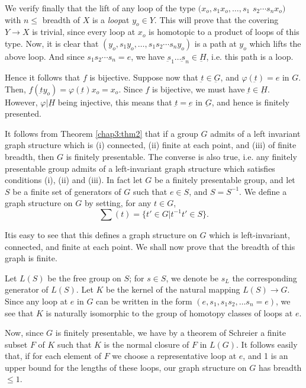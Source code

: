 We verify finally that the lift of any loop of the type $(x_o,s_1 x_o
, \ldots, s_1$ $s_2 \cdots s_n x_o)$ with $n \leq $ breadth of $X$ is a
\textit{ loop}at $y_o \in Y$. This will prove that the covering $Y \to
X$ is trivial, since every loop at $x_o$ is homotopic to a product of
loops of this type.  Now, it is clear that $(y_o,s_1 y_o , \ldots ,
s_1 s_2 \cdots s_n y_o)$ is a path at $y_o$ which lifts the above
loop. And since $s_1 s_2 \cdots s_n = e$, we have $\underbar{s}_1
\ldots \underbar{s}_n \in \underbar{H}$, i.e. this path is a loop. 

Hence it follows that $f$ is bijective. Suppose now that $\underbar{t}
\in \underbar{G}$, and $\varphi (\underbar{t}) =e$ in $G$. Then,
$f(\underbar{t} y_o) =\varphi(\underbar{t}) x_o =x_o$. Since $f$ is
bijective, we must have $\underbar{t} \in \underbar{H}$. However,
$\varphi | \underbar{H}$ being injective, this means that
$\underbar{t} = \underbar{e}$ in $\underbar{G}$, and hence is finitely
presented. 

\begin{remark*}
  It follows from Theorem \ref{chap3:thm2} that if a group $G$ admits of a left
  invariant graph structure which is (i) connected, (ii) finite at
  each point, and (iii) of finite breadth, then $G$ is finitely
  presentable. The converse is also true, i.e. any finitely presentable
  group admits of a left-invariant graph structure which satisfies
  conditions (i), (ii) and (iii). In fact let $G$ be a finitely
  presentable group, and let $S$ be a finite set of generators of $G$
  such that $e \in S$, and $S = S^{-1}$. We define a graph structure on
  $G$ by setting, for any $t \in G$, 
  $$
  \sum(t) = \{ t' \in G|t^{-1}t' \in S \}.
  $$
\end{remark*}

It\pageoriginale is easy to see that this defines a graph structure on
$G$ which is 
left-invariant, connected, and finite at each point. We shall now
prove that the breadth of this graph is finite. 

Let $L(S)$ be the free group on $S$; for $s \in S$, we denote be $s_L$
the corresponding generator of $L(S)$. Let $K$ be the kernel of the
natural mapping $L(S) \to G$. Since any loop at $e$ in $G$ can be
written in the form $(e,s_1, s_1s_2, \ldots s_n =e)$, we see that $K$
is naturally isomorphic to the group of homotopy classes of loops at
$e$. 

Now, since $G$ is finitely presentable, we have by a theorem of
Schre\-ier a finite subset $F$ of $K$ such that $K$ is the normal
closure of $F$ in 
$L(G)$. It follows easily that, if for each element of $F$ we choose a
representative loop at $e$, and 1 is an upper bound for the lengths
of these loops, our graph structure on $G$ has breadth $\leq 1$. 

